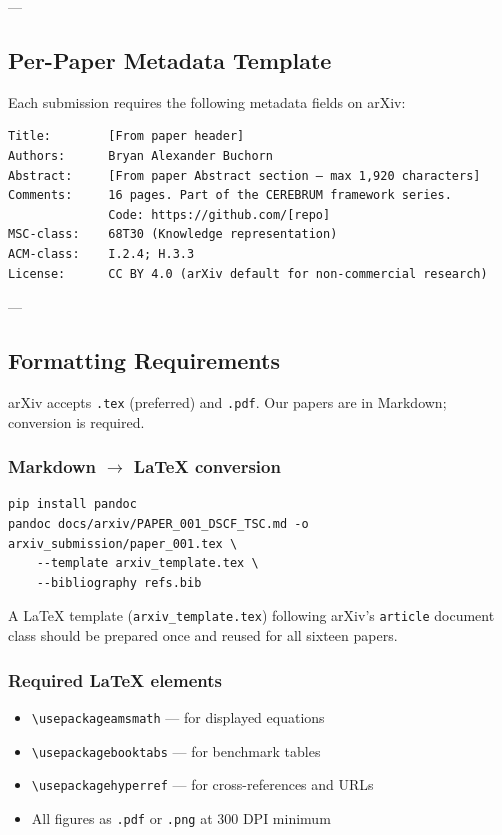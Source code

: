 \documentclass[10pt,journal,compsoc]{IEEEtran}
\begin{document}
---

\subsection{Per-Paper Metadata Template}

Each submission requires the following metadata fields on arXiv:

\begin{lstlisting}
Title:        [From paper header]
Authors:      Bryan Alexander Buchorn
Abstract:     [From paper Abstract section — max 1,920 characters]
Comments:     16 pages. Part of the CEREBRUM framework series.
              Code: https://github.com/[repo]
MSC-class:    68T30 (Knowledge representation)
ACM-class:    I.2.4; H.3.3
License:      CC BY 4.0 (arXiv default for non-commercial research)
\end{lstlisting}

---

\subsection{Formatting Requir\-ements}

arXiv accepts \texttt{.tex} (preferred) and \texttt{.pdf}. Our papers are in Markdown; conversion is required.

\subsubsection{Markdown $\to$ LaTeX conversion}

\begin{lstlisting}
pip install pandoc
pandoc docs/arxiv/PAPER_001_DSCF_TSC.md -o arxiv_submission/paper_001.tex \
    --template arxiv_template.tex \
    --bibliography refs.bib
\end{lstlisting}

A LaTeX template (\texttt{arxiv\_template.tex}) following arXiv's \texttt{article} document class should be prepared once and reused for all sixteen papers.

\subsubsection{Required LaTeX elements}
\begin{itemize}
\item \texttt{\textbackslash usepackage{amsmath}} — for displayed equations
\item \texttt{\textbackslash usepackage{booktabs}} — for benchmark tables
\item \texttt{\textbackslash usepackage{hyperref}} — for cross-references and URLs
\item All figures as \texttt{.pdf} or \texttt{.png} at 300 DPI minimum

\end{itemize}
\end{document}
